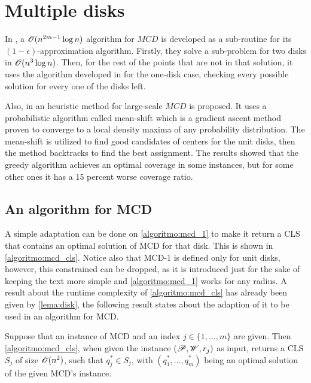 \section{Multiple disks}


In , a $\mathscr{O}(n^{2m-1}\log{n})$ algorithm for $MCD$ is developed as a sub-routine for its $(1-\epsilon)$-approximation algorithm. Firstly, they solve a sub-problem for two disks in $\mathscr{O}(n^3\log{n})$. Then, for the rest of the points that are not in that solution, it uses the algorithm developed in  for the one-disk case, checking every possible solution for every one of the disks left.

Also, in  an heuristic method for large-scale $MCD$ is proposed. It uses a probabilistic algorithm called mean-shift which is a gradient ascent method proven to converge to a local density maxima of any probability distribution. The mean-shift is utilized to find good candidates of centers for the unit disks, then the method backtracks to find the best assignment. The results showed that the greedy algorithm achieves an optimal coverage in some instances, but for some other ones it has a 15 percent worse coverage ratio.

\subsection{An algorithm for MCD}

A simple adaptation can be done on \autoref{algoritmo:mcd_1} to make it return a CLS that contains an optimal solution of MCD for that disk. This is shown in \autoref{algoritmo:mcd_cls}. 
Notice also that MCD-1 is defined only for unit disks, however, this constrained can be dropped, as it is introduced just for the sake of keeping the text more simple and \autoref{algoritmo:mcd_1} works for any radius. A result about the runtime complexity of \autoref{algoritmo:mcd_cls} has already been given by \autoref{lema:disk}, the following result states about the adaption of it to be used in an algorithm for MCD.

\begin{lema}
	Suppose that an instance of MCD and an index $j\in\{1, \dots, m\}$ are given.
	Then \autoref{algoritmo:mcd_cls}, when given the instance $(\mathscr{P}, \mathscr{W}, r_j)$ as input, returns a CLS $S_j$ of size $\mathscr{O}(n^2)$, such that $q^*_j\in S_j$, with $(q^*_1, \dots, q^*_m)$ being an optimal solution of the given MCD's instance.
\end{lema}

